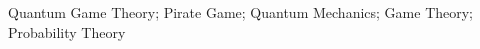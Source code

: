 \begin{keywords}
Quantum Game Theory; Pirate Game; Quantum Mechanics; Game Theory; Probability Theory
\end{keywords}
\clearpage
\thispagestyle{empty}
\cleardoublepage